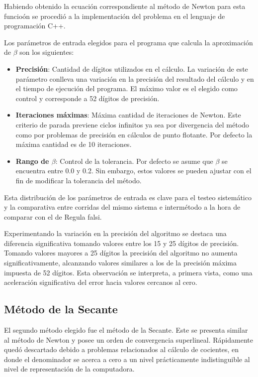 Habiendo obtenido la ecuaci\'on correspondiente al m\'etodo de Newton para esta 
funcio\'on se procedi\'o a la implementaci\'on del problema en el lenguaje 
de programaci\'on C++.

Los par\'ametros de entrada elegidos para el programa que calcula la 
aproximaci\'on de $\beta$ son los siguientes:

\begin{itemize}
  \item \textbf{Precisi\'on}: Cantidad de d\'igitos utilizados en el c\'alculo. 
La variaci\'on de este par\'ametro conlleva una variaci\'on en la precisi\'on 
del resultado del c\'alculo y en el tiempo de ejecuci\'on del programa. 
El m\'aximo valor es el elegido como control y corresponde a 52 d\'igitos de 
precisi\'on.

  \item \textbf{Iteraciones m\'aximas}: M\'axima cantidad de iteraciones de 
Newton. Este criterio de parada previene ciclos infinitos ya sea por divergencia
del m\'etodo como por problemas de precisi\'on en c\'alculos de punto flotante. 
Por defecto la m\'axima cantidad es de 10 iteraciones.

  \item \textbf{Rango de $\beta$}: Control de la tolerancia. Por defecto 
se asume que $\beta$ se encuentra entre 0.0 y 0.2. Sin embargo, estos 
valores se pueden ajustar con el fin de modificar la tolerancia del m\'etodo.
\end{itemize}

Esta distribuci\'on de los par\'ametros de entrada es clave para el testeo 
sistem\'atico y la comparativa entre corridas del mismo sistema e 
interm\'etodo a la hora de comparar con el de Regula falsi.

Experimentando la variaci\'on en la precisi\'on del algoritmo se destaca una 
diferencia significativa tomando valores entre los 15 y 25 d\'igitos de 
precisi\'on. Tomando valores mayores a 25 d\'igitos la precisi\'on del 
algoritmo no aumenta significativamente, alcanzando valores similares a los 
de la precisi\'on m\'axima impuesta de 52 d\'igitos. 
Esta observaci\'on se interpreta, a primera vista, como una aceleraci\'on 
significativa del error hacia valores cercanos al cero.

\subsection{M\'etodo de la Secante}

El segundo m\'etodo elegido fue el m\'etodo de la Secante. Este se presenta
similar al m\'etodo de Newton y posee un orden de convergencia superlineal. 
R\'apidamente qued\'o descartado debido a problemas relacionados al c\'alculo 
de cocientes, en donde el denominador se acerca a cero a un nivel 
pr\'acticamente indistinguible al nivel de representaci\'on de la computadora.


